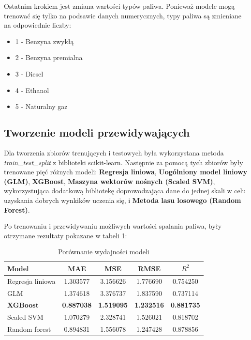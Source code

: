 \documentclass[9pt,a4paper,twoside]{rho}
\begin{document}
        Ostatnim krokiem jest zmiana wartości typów paliwa. Ponieważ modele mogą trenować się tylko na podsawie danych numerycznych, typy paliwa są zmieniane na odpowiednie liczby:\\
        \begin{itemize}
            \item 1 - Benzyna zwykłą
            \item 2 - Benzyna premialna
            \item 3 - Diesel
            \item 4 - Ethanol
            \item 5 - Naturalny gaz
         \end{itemize}
        
    \subsection*{Tworzenie modeli przewidywających}
        Dla tworzenia zbiorów trenujących i testowych była wykorzystana metoda \textit{train\_test\_split} z biblioteki scikit-learn. Następnie za pomocą tych zbiorów były trenowane pięć różnych modeli: \textbf{Regresja liniowa}, \textbf{Uogólniony model liniowy (GLM)}, \textbf{XGBoost}, \textbf{Maszyna wektorów nośnych (Scaled SVM)}, wykorzystująca dodatkową bibliotekę doprowodzająca dane do jednej skali w celu uzyskania dobrych wynkików uczenia się, i \textbf{Metoda lasu losowego (Random Forest)}.

        Po trenowaniu i przewidywaniu możliwych wartości spalania paliwa, były otrzymane rezultaty pokazane w tabeli \ref{tab:models_results}:

        \begin{table}[h]
        \centering
        \caption{Porównanie wydajności modeli}
        \label{tab:models_results}
        \begin{tabular}{lcccc}
        \toprule
        Model                  & MAE      & MSE      & RMSE     & \(R^2\)\\
        \midrule
        Regresja liniowa       & 1.303577 & 3.156626 & 1.776690 & 0.754250\\
        GLM                    & 1.374618 & 3.376737 & 1.837590 & 0.737114\\
        \textbf{XGBoost}                & \textbf{0.887038} & \textbf{1.519095} & \textbf{1.232516} & \textbf{0.881735}\\
        Scaled SVM             & 1.070279 & 2.328741 & 1.526021 & 0.818702\\
        Random forest          & 0.894831 & 1.556078 & 1.247428 & 0.878856\\
        \bottomrule
        \end{tabular}
        \end{table}
\end{document}
